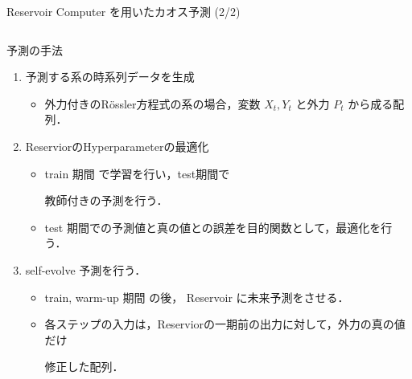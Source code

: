 \begin{frame}{Reservoir Computer を用いたカオス予測 (2/2)}
\begin{columns}[T] %

    \begin{column}{.5\textwidth}
    \begin{block}{予測の手法}
      \begin{enumerate}
        \item 予測する系の時系列データを生成\begin{itemize}
          \item 外力付きのRössler方程式の系の場合，変数 $X_t, Y_t$ と外力 $P_t$ から成る配列．
        \end{itemize}
        \item ReserviorのHyperparameterの最適化\begin{itemize}
          \item train 期間 で学習を行い，test期間で
          
          教師付きの予測を行う．
          \item test 期間での予測値と真の値との誤差を目的関数として，最適化を行う．
        \end{itemize}
        \item self-evolve 予測を行う．\begin{itemize}
          \item train, warm-up 期間 の後，
          Reservoir に未来予測をさせる．
          \item 各ステップの入力は，Reserviorの一期前の出力に対して，外力の真の値だけ
          
          修正した配列．
        \end{itemize}
    \end{enumerate}
    \end{block}
    \end{column}


\end{columns}
\end{frame}

